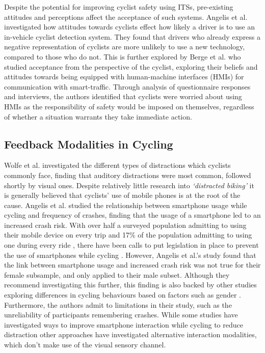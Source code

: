 \documentclass{interim}
\begin{document}
Despite the potential for improving cyclist safety using ITSs, pre-existing attitudes and perceptions affect the acceptance of such systems. Angelis et al. \cite{de2017negative} investigated how attitudes towards cyclists effect how likely a driver is to use an in-vehicle cyclist detection system. They found that drivers who already express a negative representation of cyclists are more unlikely to use a new technology, compared to those who do not. This is further explored by Berge et al. \cite{berge2022cyclists} who studied acceptance from the perspective of the cyclist, exploring their beliefs and attitudes towards being equipped with human-machine interfaces (HMIs) for communication with smart-traffic. Through analysis of questionnaire responses and interviews, the authors identified that cyclists were worried about using HMIs as the responsibility of safety would be imposed on themselves, regardless of whether a situation warrants they take immediate action. 


\subsection{Feedback Modalities in Cycling}
Wolfe et al. \cite{wolfe2016distracted} investigated the different types of distractions which cyclists commonly face, finding that auditory distractions were most common, followed shortly by visual ones. Despite relatively little research into \textit{‘distracted biking’} \cite{mwakalonge2014distracted} it is generally believed that cyclists’ use of mobile phones is at the root of the cause. Angelis et al. \cite{doi:10.1080/19439962.2019.1591559} studied the relationship between smartphone usage while cycling and frequency of crashes, finding that the usage of a smartphone led to an increased crash risk. With over half a surveyed population admitting to using their mobile device on every trip \cite{GOLDENBELD20121} and 17\% of the population admitting to using one during every ride \cite{goldenbeld2010use}, there have been calls to put legislation in place to prevent the use of smartphones while cycling \cite{banphoneuse}. However, Angelis et al.'s study found that the link between smartphone usage and increased crash risk was not true for their female subsample, and only applied to their male subset. Although they recommend investigating this further, this finding is also backed by other studies exploring differences in cycling behaviours based on factors such as gender \cite{BEHNOOD201735}. Furthermore, the authors admit to limitations in their study, such as the unreliability of participants remembering crashes. While some studies have investigated ways to improve smartphone interaction while cycling to reduce distraction \cite{10.1145/3544548.3580971, 10.1145/3152832.3152871} other approaches have investigated alternative interaction modalities, which don’t make use of the visual sensory channel.
\end{document}
